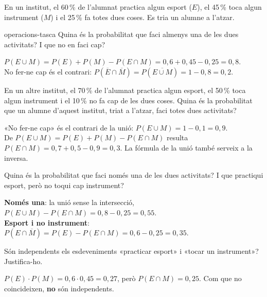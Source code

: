 En un institut, el 60\,\% de l'alumnat practica algun esport ($E$), el 45\,\% toca algun instrument ($M$)
i el 25\,\% fa totes dues coses. Es tria un alumne a l'atzar.

\begin{apartats}

\begin{tria}{operacions-tasca}
Quina és la probabilitat que faci almenys una de les dues activitats? I que no en faci cap?

\begin{solucio}
$P(E\cup M)=P(E)+P(M)-P(E\cap M)=0{,}6+0{,}45-0{,}25=0{,}8$.\\
No fer-ne cap és el contrari: $P\left(\overline{E}\cap\overline{M}\right)=P\left(\overline{E\cup M}\right)
=1-0{,}8=0{,}2$.
\end{solucio}

En un altre institut, el 70\,\% de l'alumnat practica algun esport, el 50\,\% toca algun instrument i el
10\,\% no fa cap de les dues coses. Quina és la probabilitat que un alumne d'aquest institut, triat a
l'atzar, faci totes dues activitats?

\begin{solucio}
«No fer-ne cap» és el contrari de la unió: $P(E\cup M)=1-0{,}1=0{,}9$.\\
De $P(E\cup M)=P(E)+P(M)-P(E\cap M)$ resulta $P(E\cap M)=0{,}7+0{,}5-0{,}9=0{,}3$. La fórmula de la unió
també serveix a la inversa.
\end{solucio}
\end{tria}

Quina és la probabilitat que faci només una de les dues activitats? I que practiqui esport, però no toqui
cap instrument?

\begin{solucio}
\textbf{Només una}: la unió sense la intersecció, $P(E\cup M)-P(E\cap M)=0{,}8-0{,}25=0{,}55$.\\
\textbf{Esport i no instrument}: $P\left(E\cap\overline{M}\right)=P(E)-P(E\cap M)=0{,}6-0{,}25=0{,}35$.
\end{solucio}

\begin{nomesllarg}
Són independents els esdeveniments «practicar esport» i «tocar un instrument»? Justifica-ho.

\begin{solucio}
$P(E)\cdot P(M)=0{,}6\cdot0{,}45=0{,}27$, però $P(E\cap M)=0{,}25$. Com que no coincideixen, \textbf{no}
són independents.
\end{solucio}
\end{nomesllarg}

\end{apartats}
